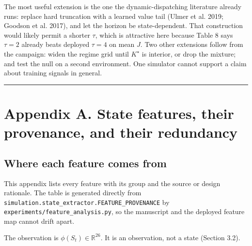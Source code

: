\documentclass[review,3p,times]{elsarticle}
\theoremstyle{definition}
\begin{document}
The most useful extension is the one the dynamic-dispatching literature
already runs: replace hard truncation with a learned value tail (Ulmer
et al. 2019; Goodson et al. 2017), and let the horizon be
state-dependent. That construction would likely permit a shorter
\(\tau\), which is attractive here because Table 8 says \(\tau=2\)
already beats deployed \(\tau=4\) on mean \(J\). Two other extensions
follow from the campaign: widen the regime grid until \(K^\star\) is
interior, or drop the mixture; and test the null on a second
environment. One simulator cannot support a claim about training signals
in general.

\begin{center}\rule{0.5\linewidth}{0.5pt}\end{center}

\section{Appendix A. State features, their provenance, and their
redundancy}\label{appendix-a.-state-features-their-provenance-and-their-redundancy}

\subsection{Where each feature comes
from}\label{where-each-feature-comes-from}

This appendix lists every feature with its group and the source or
design rationale. The table is generated directly from
\texttt{simulation.state\_extractor.FEATURE\_PROVENANCE} by
\texttt{experiments/feature\_analysis.py}, so the manuscript and the
deployed feature map cannot drift apart.

The observation is \(\phi(S_t) \in \mathbb{R}^{26}\). It is an
observation, not a state (Section 3.2).
\end{document}

